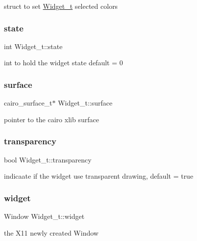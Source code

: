 struct to set \hyperlink{structWidget__t}{Widget\+\_\+t} selected colors \mbox{\label{structWidget__t_aaa935b64805fdeb78acb015c67d6638c}} 
\subsubsection{\texorpdfstring{state}{state}}
{\footnotesize\ttfamily int Widget\+\_\+t\+::state}

int to hold the widget state default = 0 \mbox{\label{structWidget__t_ae9b5979742ea31817ff7d7b34a56f88d}} 
\subsubsection{\texorpdfstring{surface}{surface}}
{\footnotesize\ttfamily cairo\+\_\+surface\+\_\+t$\ast$ Widget\+\_\+t\+::surface}

pointer to the cairo xlib surface \mbox{\label{structWidget__t_a42a597c21eca964c0296fc7026feb43b}} 
\subsubsection{\texorpdfstring{transparency}{transparency}}
{\footnotesize\ttfamily bool Widget\+\_\+t\+::transparency}

indicaate if the widget use transparent drawing, default = true \mbox{\label{structWidget__t_acb2bfb41674371ee1220a9d6a2d89fb1}} 
\subsubsection{\texorpdfstring{widget}{widget}}
{\footnotesize\ttfamily Window Widget\+\_\+t\+::widget}

the X11 newly created Window \mbox{\label{structWidget__t_a3204c88196ed5793250b3530dd719037}} 
